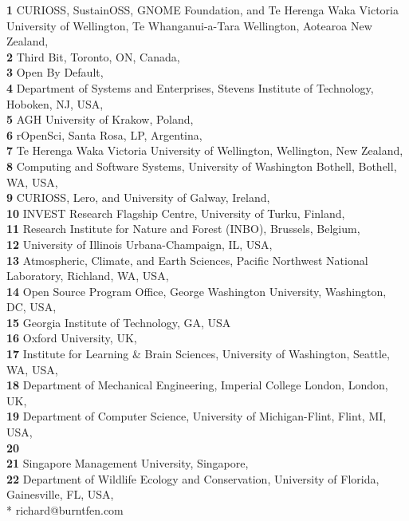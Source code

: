 \documentclass[10pt,letterpaper]{article}
\begin{document}
\begin{flushleft}
\textbf{1} CURIOSS, SustainOSS, GNOME Foundation, and Te Herenga Waka Victoria University of Wellington, Te Whanganui-a-Tara Wellington, Aotearoa New Zealand, \\
\textbf{2} Third Bit, Toronto, ON, Canada, \\
\textbf{3} Open By Default, \\
\textbf{4} Department of Systems and Enterprises, Stevens Institute of Technology, Hoboken, NJ, USA, \\
\textbf{5} AGH University of Krakow, Poland, \\
\textbf{6} rOpenSci, Santa Rosa, LP, Argentina, \\
\textbf{7} Te Herenga Waka Victoria University of Wellington, Wellington, New Zealand, \\
\textbf{8} Computing and Software Systems, University of Washington Bothell, Bothell, WA, USA, \\
\textbf{9} CURIOSS, Lero, and University of Galway, Ireland, \\
\textbf{10} INVEST Research Flagship Centre, University of Turku, Finland, \\
\textbf{11} Research Institute for Nature and Forest (INBO), Brussels, Belgium, \\
\textbf{12} University of Illinois Urbana-Champaign, IL, USA, \\
\textbf{13} Atmospheric, Climate, and Earth Sciences, Pacific Northwest National Laboratory, Richland, WA, USA, \\
\textbf{14} Open Source Program Office, George Washington University, Washington, DC, USA, \\
\textbf{15} Georgia Institute of Technology, GA, USA  \\
\textbf{16} Oxford University, UK, \\
\textbf{17} Institute for Learning \& Brain Sciences, University of Washington, Seattle, WA, USA, \\
\textbf{18} Department of Mechanical Engineering, Imperial College London, London, UK, \\
\textbf{19} Department of Computer Science, University of Michigan-Flint, Flint, MI, USA, \\
\textbf{20} \\
\textbf{21} Singapore Management University, Singapore, \\
\textbf{22} Department of Wildlife Ecology and Conservation, University of Florida, Gainesville, FL, USA, \\
* richard@burntfen.com
\end{flushleft}
\end{document}
